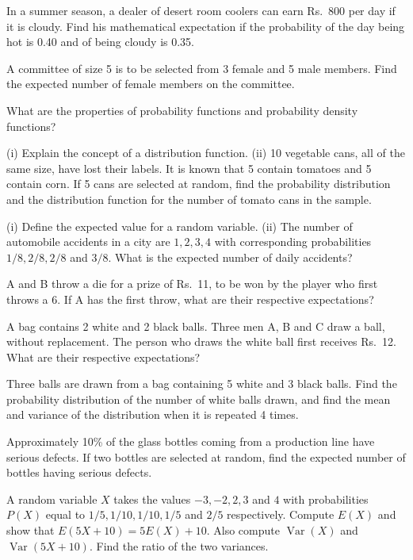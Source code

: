\documentclass[11pt,a4paper]{article}
\begin{document}
\begin{longlist}
\item In a summer season, a dealer of desert room coolers can earn Rs.\ 800 per day if it is cloudy. Find his mathematical expectation if the probability of the day being hot is 0.40 and of being cloudy is 0.35.

\item A committee of size 5 is to be selected from 3 female and 5 male members. Find the expected number of female members on the committee.

\item What are the properties of probability functions and probability density functions?

\item (i) Explain the concept of a distribution function. (ii) 10 vegetable cans, all of the same size, have lost their labels. It is known that 5 contain tomatoes and 5 contain corn. If 5 cans are selected at random, find the probability distribution and the distribution function for the number of tomato cans in the sample.

\item (i) Define the expected value for a random variable. (ii) The number of automobile accidents in a city are $1,2,3,4$ with corresponding probabilities $1/8, 2/8, 2/8$ and $3/8$. What is the expected number of daily accidents?

\item A and B throw a die for a prize of Rs.\ 11, to be won by the player who first throws a 6. If A has the first throw, what are their respective expectations?

\item A bag contains 2 white and 2 black balls. Three men A, B and C draw a ball, without replacement. The person who draws the white ball first receives Rs.\ 12. What are their respective expectations?

\item Three balls are drawn from a bag containing 5 white and 3 black balls. Find the probability distribution of the number of white balls drawn, and find the mean and variance of the distribution when it is repeated 4 times.

\item Approximately 10\% of the glass bottles coming from a production line have serious defects. If two bottles are selected at random, find the expected number of bottles having serious defects.

\item A random variable $X$ takes the values $-3,-2,2,3$ and $4$ with probabilities $P(X)$ equal to $1/5,1/10,1/10,1/5$ and $2/5$ respectively. Compute $E(X)$ and show that $E(5X+10)=5E(X)+10$. Also compute $\operatorname{Var}(X)$ and $\operatorname{Var}(5X+10)$. Find the ratio of the two variances.


\end{longlist}
\end{document}
